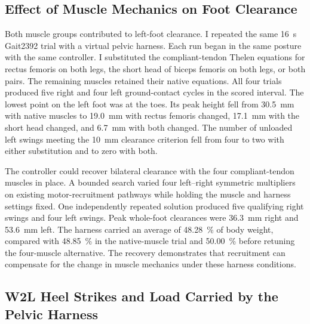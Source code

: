 \subsection{Effect of Muscle Mechanics on Foot Clearance}\label{sec:app_muscle_clearance}
Both muscle groups contributed to left-foot clearance. I repeated the same \qty{16}{\second} Gait2392 trial with a virtual pelvic harness. Each run began in the same posture with the same controller. I substituted the compliant-tendon Thelen equations for rectus femoris on both legs, the short head of biceps femoris on both legs, or both pairs. The remaining muscles retained their native equations. All four trials produced five right and four left ground-contact cycles in the scored interval. The lowest point on the left foot was at the toes. Its peak height fell from \qty{30.5}{\milli\meter} with native muscles to \qty{19.0}{\milli\meter} with rectus femoris changed, \qty{17.1}{\milli\meter} with the short head changed, and \qty{6.7}{\milli\meter} with both changed. The number of unloaded left swings meeting the \qty{10}{\milli\meter} clearance criterion fell from four to two with either substitution and to zero with both.

The controller could recover bilateral clearance with the four compliant-tendon muscles in place. A bounded search varied four left--right symmetric multipliers on existing motor-recruitment pathways while holding the muscle and harness settings fixed. One independently repeated solution produced five qualifying right swings and four left swings. Peak whole-foot clearances were \qty{36.3}{\milli\meter} right and \qty{53.6}{\milli\meter} left. The harness carried an average of \qty{48.28}{\percent} of body weight, compared with \qty{48.85}{\percent} in the native-muscle trial and \qty{50.00}{\percent} before retuning the four-muscle alternative. The recovery demonstrates that recruitment can compensate for the change in muscle mechanics under these harness conditions.

\subsection{W2L Heel Strikes and Load Carried by the Pelvic Harness}\label{sec:app_supported_replays}

